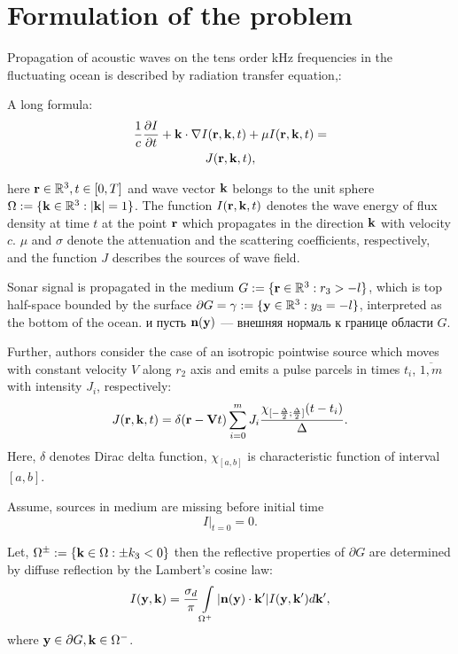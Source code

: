 \documentclass{procDDs}
\begin{document}
\section{Formulation of the problem}
Propagation of acoustic waves on the tens order kHz frequencies in the fluctuating ocean is described by radiation
transfer equation\cite{p11},\cite{p12}:

A long formula:
\begin{multline}
	\label{model}
	\frac{1}{c} \frac{\partial I}{\partial t} + \mathbf{k} \cdot \nabla I(\mathbf{r},\mathbf{k},t) + 
	\mu I(\mathbf{r},\mathbf{k},t) = \\ J(\mathbf{r},\mathbf{k},t),
\end{multline}

here $\mathbf{r} \in \mathbb{R}^3, t \in [0, T]$ and wave vector $\mathbf{k}$ belongs to the unit sphere $\Omega := \{\mathbf{k} \in \mathbb{R}^3: |\mathbf{k}| = 1\}$. The function $I(\mathbf{r},\mathbf{k}, t)$ denotes the wave energy of flux density at time $t$  at the point $\mathbf{r}$ which propagates in the direction $\mathbf{k}$  with velocity $c$. $\mu$ and $\sigma$ denote the attenuation and the scattering coefficients, respectively, and the function $J$ describes the sources of
wave field.

Sonar signal is propagated in the medium $G:=\{\mathbf{r} \in \mathbb{R}^3:r_3 > -l\}$, which is top half-space bounded by the surface $\partial G = \gamma := \{\mathbf{y} \in \mathbb{R}^3: y_3 = -l \}$, interpreted as the bottom of the ocean. и пусть $\textbf{n}(\mathbf{y})$ --- внешняя нормаль к  границе области $G$. 



Further, authors consider the case of an isotropic pointwise source which moves with constant velocity $V$ along $r_2$ axis and emits a pulse parcels in times $t_i$, $\overline{1,m}$ with intensity $J_i$, respectively: 
\begin{equation}
	\label{source}
	J(\mathbf{r},\mathbf{k}, t) = \delta(\mathbf{r} - \mathbf{V} t)\sum\limits_{i=0}^{m} J_i \frac{ \chi_{[-\frac{\Delta}{2};\frac{\Delta}{2}]}(t-t_i)}{\Delta}.
\end{equation}
Here, $\delta$ denotes Dirac delta function, $\chi_{[a,b]}$ is characteristic function of interval $[a,b]$.

Assume, sources in medium are missing before initial time
\begin{equation}
	\label{init_cond}
	I\rvert_{t=0}=0.
\end{equation}

Let, $\Omega^\pm := \{\mathbf{k} \in \Omega: \pm k_3 < 0\}$ then the reflective properties of $\partial G$  are determined by diffuse reflection by the Lambert’s cosine law:
\begin{equation}
	\label{boundary_condition}
	I(\mathbf{y},\mathbf{k}) = \frac{\sigma_d}{\pi} \int\limits_{\Omega ^+}|\mathbf{n}(\mathbf{y})\cdot \mathbf{k}'| I(\mathbf{y},\mathbf{k}') d\mathbf{k}' ,
\end{equation}
where  $\mathbf{y} \in \partial G, \mathbf{k} \in \Omega^-$.
\end{document}
